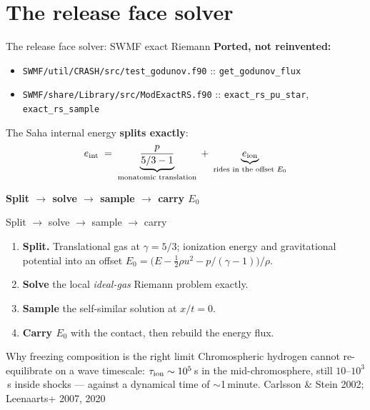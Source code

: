 \documentclass[aspectratio=169]{beamer}
\newcommand{\src}[1]{{\scriptsize\color{gray}#1}}
\begin{document}
\section{The release face solver}

\begin{frame}{The release face solver: SWMF exact Riemann}
  \textbf{Ported, not reinvented:}
  \vspace{2pt}
  \begin{itemize}\footnotesize\itemsep1pt
    \item \texttt{SWMF/util/CRASH/src/test\_godunov.f90} :: \texttt{get\_godunov\_flux}
    \item \texttt{SWMF/share/Library/src/ModExactRS.f90} ::
          \texttt{exact\_rs\_pu\_star}, \texttt{exact\_rs\_sample}
  \end{itemize}
  \vspace{10pt}
  The Saha internal energy \textbf{splits exactly}:
  \vspace{-2pt}
  \begin{equation*}
    e_{\rm int} \;=\;
      \underbrace{\frac{p}{5/3-1}}_{\text{monatomic translation}}
      \;+\;
      \underbrace{e_{\rm ion}}_{\text{rides in the offset } E_0}
  \end{equation*}
  \vspace{2pt}
  \begin{center}
    \textbf{Split $\rightarrow$ solve $\rightarrow$ sample $\rightarrow$ carry $E_0$}
  \end{center}
\end{frame}

\begin{frame}{Split $\rightarrow$ solve $\rightarrow$ sample $\rightarrow$ carry}
  \vfill
  \begin{enumerate}\itemsep10pt
    \item \textbf{Split.} Translational gas at $\gamma=5/3$; ionization energy
          and gravitational potential into an offset
          $E_0=\bigl(E-\tfrac12\rho u^2-p/(\gamma-1)\bigr)/\rho$.
    \item \textbf{Solve} the local \emph{ideal-gas} Riemann problem exactly.
    \item \textbf{Sample} the self-similar solution at $x/t=0$.
    \item \textbf{Carry $E_0$} with the contact, then rebuild the energy flux.
  \end{enumerate}
  \vfill
  \begin{block}{Why freezing composition is the right limit}
    Chromospheric hydrogen cannot re-equilibrate on a wave timescale:
    $\tau_{\rm ion}\sim10^5$\,s in the mid-chromosphere, still $10$--$10^3$\,s
    inside shocks --- against a dynamical time of $\sim$1\,minute.
    \src{Carlsson \& Stein 2002; Leenaarts+ 2007, 2020}
  \end{block}
\end{frame}
\end{document}
